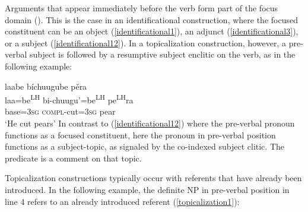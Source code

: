 Arguments that appear immediately before the verb form part of the focus domain (). This is the case in an identificational construction, where the focused constituent can be an object (\ref{identificational1}), an adjunct (\ref{identificational3}), or a subject (\ref{identificational12}). In a topicalization construction, however, a pre-verbal subject is followed by a resumptive subject enclitic on the verb, as in the following example:

\ea\label{topicalization}
\glll laabe b\'{i}chuugube p\v{e}ra  \\
laa=be\textsuperscript{LH} bi-chuugu'=be\textsuperscript{LH} pe\textsuperscript{LH}ra  \\
base=\textsc{3sg} \textsc{compl}-cut=\textsc{3sg} pear  \\
\glt `He cut pears' 
\z
In contrast to (\ref{identificational12}) where the pre-verbal pronoun functions as a focused constituent, here the pronoun in pre-verbal position functions as a subject-topic, as signaled by the co-indexed subject clitic. The predicate is a comment on that topic. 

Topicalization constructions typically occur with referents that have already been introduced. In the following example, the definite NP in pre-verbal position in line 4 refers to an already introduced referent (\ref{topicalization1}):

